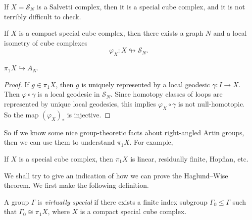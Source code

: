 \documentclass[a4paper]{article}
\begin{document}
\begin{eg}
  If $X = \mathcal{S}_N$ is a Salvetti complex, then it is a special cube complex, and it is not terribly difficult to check.
\end{eg}

\begin{thm}
  If $X$ is a compact special cube complex, then there exists a graph $N$ and a local isometry of cube complexes
  \[
    \varphi_X: X \looparrowright \mathcal{S}_N.
  \]
\end{thm}

\begin{cor}
  $\pi_1 X \hookrightarrow A_N$.
\end{cor}

\begin{proof}
  If $g \in \pi_1 X$, then $g$ is uniquely represented by a local geodesic $\gamma: I \to X$. Then $\varphi \circ \gamma$ is a local geodesic in $\mathcal{S}_N$. Since homotopy classes of loops are represented by unique local geodesics, this implies $\varphi_X \circ \gamma$ is not null-homotopic. So the map $(\varphi_X)_*$ is injective.
\end{proof}

So if we know some nice group-theoretic facts about right-angled Artin groups, then we can use them to understand $\pi_1X$. For example,
\begin{cor}
  If $X$ is a special cube complex, then $\pi_1 X$ is linear, residually finite, Hopfian, etc.
\end{cor}
We shall try to give an indication of how we can prove the Haglund--Wise theorem. We first make the following definition.
\begin{defi}
  A group $\Gamma$ is \emph{virtually special} if there exists a finite index subgroup $\Gamma_0 \leq \Gamma$ such that $\Gamma_0 \cong \pi_1 X$, where $X$ is a compact special cube complex.
\end{defi}
\end{document}
